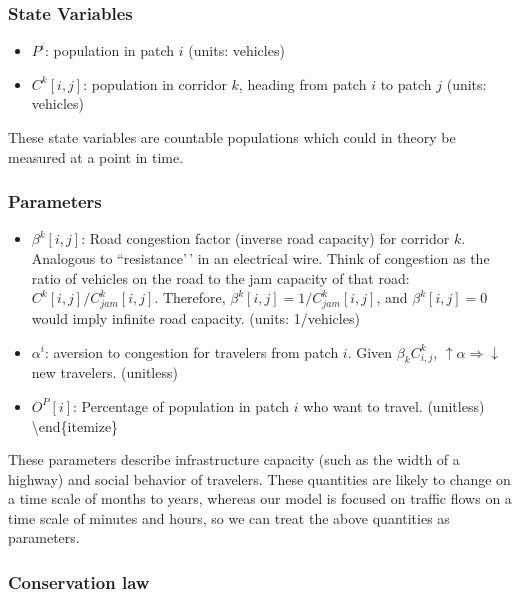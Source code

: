 \documentclass[
]{article}
\providecommand{\tightlist}{%
  \setlength{\itemsep}{0pt}\setlength{\parskip}{0pt}}
\begin{document}
\subsubsection{State Variables}\label{state-variables}

\begin{itemize}
\tightlist
\item
  \(P^i\): population in patch \(i\) (units: vehicles)
\item
  \(C^k[i,j]\): population in corridor \(k\), heading from patch \(i\)
  to patch \(j\) (units: vehicles)
\end{itemize}

These state variables are countable populations which could in theory be
measured at a point in time.

\subsubsection{Parameters}\label{parameters}

\begin{itemize}
\tightlist
\item
  \(\beta^k[i,j]\): Road congestion factor (inverse road capacity) for
  corridor \(k\). Analogous to ``resistance'\,' in an electrical wire.
  Think of congestion as the ratio of vehicles on the road to the jam
  capacity of that road: \(C^k[i,j] / C^k_{jam}[i,j]\). Therefore,
  \(\beta^k[i,j] = 1 / C^k_{jam}[i,j]\), and \(\beta^k[i,j]=0\) would
  imply infinite road capacity. (units: 1/vehicles)
\item
  \(\alpha^i\): aversion to congestion for travelers from patch \(i\).
  Given \(\beta_k C^k_{i,j}\),
  \(\uparrow \alpha \Rightarrow \downarrow\) new travelers. (unitless)
\item
  \(O^P[i]\): Percentage of population in patch \(i\) who want to
  travel. (unitless) \textbackslash end\{itemize\}
\end{itemize}

These parameters describe infrastructure capacity (such as the width of
a highway) and social behavior of travelers. These quantities are likely
to change on a time scale of months to years, whereas our model is
focused on traffic flows on a time scale of minutes and hours, so we can
treat the above quantities as parameters.

\subsubsection{Conservation law}\label{conservation-law}
\end{document}
